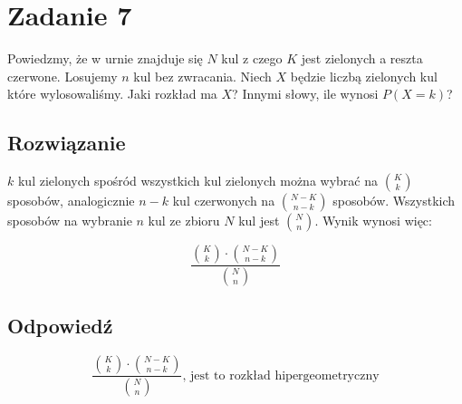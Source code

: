 \section{Zadanie 7}
Powiedzmy, że w urnie znajduje się \(N\) kul z czego \(K\) jest zielonych a reszta czerwone. Losujemy \(n\) kul bez zwracania.
Niech \(X\) będzie liczbą zielonych kul które wylosowaliśmy. Jaki rozkład ma \(X\)? Innymi słowy, ile wynosi \(P(X = k)\)?

\subsection*{Rozwiązanie}
\(k\) kul zielonych spośród wszystkich kul zielonych można wybrać na \(\binom{K}{k}\) sposobów, analogicznie \(n-k\) kul czerwonych na \(\binom{N-K}{n-k}\) sposobów. Wszystkich sposobów na wybranie \(n\) kul ze zbioru \(N\) kul jest \(\binom{N}{n}\). Wynik wynosi więc:

\[
	\frac{\binom{K}{k} \cdot \binom{N-K}{n-k}}{\binom{N}{n}}
\]

\subsection*{Odpowiedź}
\[
	\boxed{\frac{\binom{K}{k} \cdot \binom{N-K}{n-k}}{\binom{N}{n}} \text{, jest to rozkład hipergeometryczny}}
\]
